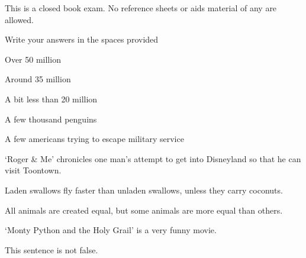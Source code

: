 \documentclass{seneca_final}
\begin{document}

   \AddStudentInfo
   \begin{SpecialInstructions}
      \item This is a closed book exam. No reference sheets or aids material of any are allowed.
      \item Write your answers in the spaces provided
   \end{SpecialInstructions}



   \begin{multiple_choice}
      \item Over 50 million
      \item Around 35 million
      \item A bit less than 20 million
      \item A few thousand penguins
      \item A few americans trying to escape military service
   \end{multiple_choice}

   \begin{true_false}
      \item ‘Roger \& Me’ chronicles one man’s attempt to get into Disneyland so that he can visit Toontown.
      \item Laden swallows fly faster than unladen swallows, unless they carry coconuts.
      \item All animals are created equal, but some animals are more equal than others.
      \item ‘Monty Python and the Holy Grail’ is a very funny movie.
      \item This sentence is not false.
   \end{true_false}
\end{document}
